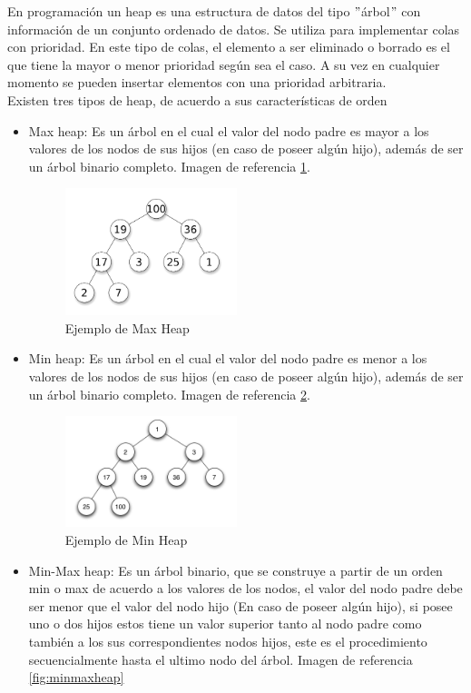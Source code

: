 En programación un heap es una estructura de datos del tipo $"$árbol$"$ con información de un conjunto ordenado de datos. Se utiliza para implementar colas con prioridad. En este tipo de colas, el elemento a ser eliminado o borrado es el que tiene la mayor o menor prioridad según sea el caso. A su vez en cualquier momento se pueden insertar elementos con una prioridad arbitraria.	
\\
Existen tres tipos de heap, de acuerdo a sus características de orden
\begin{itemize}
	\item Max heap: Es un árbol en el cual el valor del nodo padre es mayor a los valores de los nodos de sus hijos (en caso de poseer algún hijo), además de ser un árbol binario completo. Imagen de referencia \ref{fig:maxheap}.
	\begin{figure}[hbtp]
	\centering
	\includegraphics[width=5cm]{fig/Max-Heap.png}
	\caption{\label{fig:maxheap} Ejemplo de Max Heap}
\end{figure} 
	\item Min heap: Es un árbol en el cual el valor del nodo padre es menor a los valores de los nodos de sus hijos (en caso de poseer algún hijo), además de ser un árbol binario completo. Imagen de referencia \ref{fig:minheap}.
\begin{figure}[hbtp]
	\centering
	\includegraphics[width=5cm]{fig/Min-heap.png}
	\caption{\label{fig:minheap} Ejemplo de Min Heap}
\end{figure} 	  
	\item Min-Max heap: Es un árbol binario, que se construye a partir de un orden min  o max de acuerdo a los valores de los nodos, el valor del nodo padre debe ser menor que el valor del nodo hijo (En caso de poseer algún hijo), si posee uno o dos hijos estos tiene un valor superior tanto al nodo padre como también a los sus correspondientes nodos hijos, este es el procedimiento secuencialmente hasta el ultimo nodo del árbol. Imagen de referencia \ref{fig:minmaxheap}

\end{itemize}
